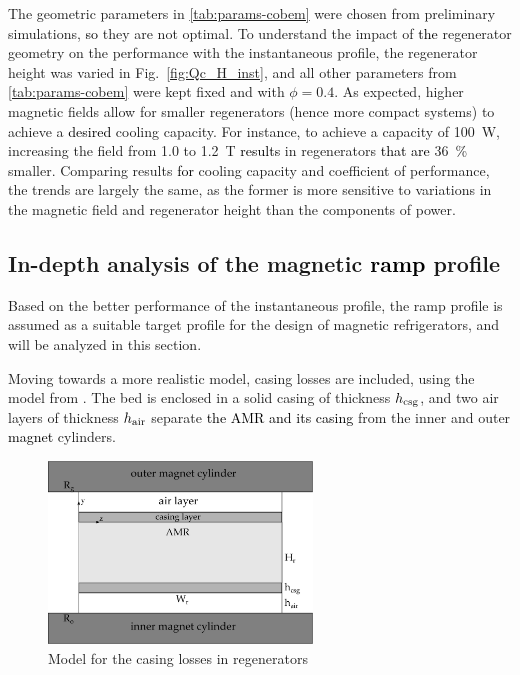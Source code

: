 \documentclass[referee]{svjour3}
\begin{document}
The geometric parameters in \autoref{tab:params-cobem} were chosen from preliminary simulations, \textcolor{black}{so} they are not  optimal. To understand the impact of \textcolor{black}{the} regenerator geometry on the performance with the instantaneous profile, the regenerator height was varied in Fig.~\ref{fig:Qc_H_inst}, and all other parameters from \autoref{tab:params-cobem} were kept fixed and with $\phi=0.4$. As expected, higher magnetic fields allow for smaller regenerators (hence more compact systems) to achieve a \textcolor{black}{desired} cooling capacity. For instance, to achieve a capacity of \SI{100}{\watt}, increasing the field from \num{1.0} to \SI{1.2}{\tesla} \textcolor{black}{results} in regenerators \textcolor{black}{that are} \SI{36}{\percent} smaller. Comparing results \textcolor{black}{for} cooling capacity and coefficient of performance, the trends are largely the same, as the former is more sensitive to variations in the magnetic field and regenerator height than the components of power.


\subsection{In-depth analysis of the  magnetic \textcolor{black}{ramp} profile}
\label{sec:performance-an-amr-1}

Based on the better performance of the instantaneous profile, the ramp profile is assumed as a suitable target profile for the design of magnetic refrigerators, and will be analyzed in this section.

Moving towards a more realistic model, casing losses are included, using the model from \cite{bib:trevizoli16_perfor_model}. The bed is enclosed in a solid casing of thickness $h_{\mathrm{csg}}$, and two air layers of thickness $h_{\mathrm{air}}$ separate \textcolor{black}{the AMR and its casing} from the inner and outer \textcolor{black}{magnet} cylinders. 

\begin{figure}[!ht]
  \centering
  \includegraphics[width=7cm]{amr-casing}
  \caption{Model for the casing losses in regenerators}
  \label{fig:amr-casing}
\end{figure}
\end{document}
